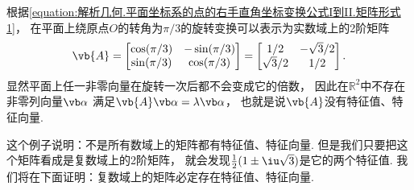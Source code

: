 \begin{example}
根据\cref{equation:解析几何.平面坐标系的点的右手直角坐标变换公式I到II.矩阵形式1}，
在平面上绕原点\(O\)的转角为\(\pi/3\)的旋转变换可以表示为实数域上的2阶矩阵\[
	\vb{A}
	= \begin{bmatrix}
		\cos(\pi/3) & -\sin(\pi/3) \\
		\sin(\pi/3) & \cos(\pi/3)
	\end{bmatrix}
	= \begin{bmatrix}
		1/2 & -\sqrt3/2 \\
		\sqrt3/2 & 1/2
	\end{bmatrix}.
\]
显然平面上任一非零向量在旋转一次后都不会变成它的倍数，
因此在\(\mathbb{R}^2\)中不存在非零列向量\(\vb\alpha\)
满足\(\vb{A}\vb\alpha=\lambda\vb\alpha\)，
也就是说\(\vb{A}\)没有特征值、特征向量.

这个例子说明：不是所有数域上的矩阵都有特征值、特征向量.
但是我们只要把这个矩阵看成是复数域上的2阶矩阵，
就会发现\(\frac12(1\pm\iu\sqrt3)\)是它的两个特征值.
我们将在下面证明：复数域上的矩阵必定存在特征值、特征向量.
\end{example}

